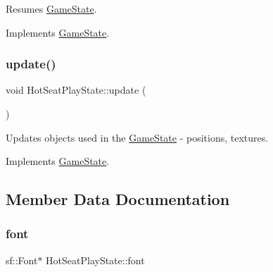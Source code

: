 Resumes \mbox{\hyperlink{class_game_state}{Game\+State}}. 



Implements \mbox{\hyperlink{class_game_state_a4a421c44f4dae6e9a4fbe10b6e8c47ac}{Game\+State}}.

\mbox{\label{class_hot_seat_play_state_a63baf261e84e10203286fc82082cccdd}} 
\subsubsection{\texorpdfstring{update()}{update()}}
{\footnotesize\ttfamily void Hot\+Seat\+Play\+State\+::update (\begin{DoxyParamCaption}\item[{\mbox{\hyperlink{class_game_engine}{Game\+Engine}} $\ast$}]{ }\end{DoxyParamCaption})\hspace{0.3cm}{\ttfamily [virtual]}}



Updates objects used in the \mbox{\hyperlink{class_game_state}{Game\+State}} -\/ positions, textures. 



Implements \mbox{\hyperlink{class_game_state_a66b11afe355a9479f94aaf76576980bd}{Game\+State}}.



\subsection{Member Data Documentation}
\mbox{\label{class_hot_seat_play_state_a6a34ef6a18051ddf5578f70c125dcf1c}} 
\subsubsection{\texorpdfstring{font}{font}}
{\footnotesize\ttfamily sf\+::\+Font$\ast$ Hot\+Seat\+Play\+State\+::font\hspace{0.3cm}{\ttfamily [private]}}

\mbox{\label{class_hot_seat_play_state_a056e1531092623f0e86672a3eb36d57e}} 
